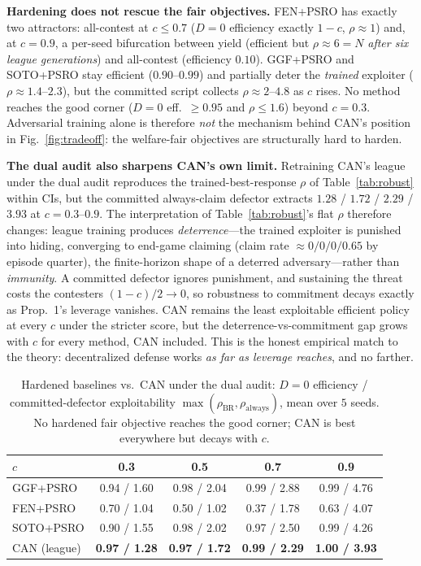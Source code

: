 \documentclass[conference, a4paper]{IEEEtran}
\begin{document}
\textbf{Hardening does not rescue the fair objectives.} FEN+PSRO has exactly two
attractors: all-contest at $c\le0.7$ ($D{=}0$ efficiency exactly $1{-}c$,
$\rho{\approx}1$) and, at $c{=}0.9$, a per-seed bifurcation between yield
(efficient but $\rho{\approx}6{=}N$ \emph{after six league generations}) and
all-contest (efficiency $0.10$). GGF+PSRO and SOTO+PSRO stay efficient
($0.90$--$0.99$) and partially deter the \emph{trained} exploiter
($\rho{\approx}1.4$--$2.3$), but the committed script collects
$\rho{\approx}2$--$4.8$ as $c$ rises. No method reaches the good corner
($D{=}0$ eff.\ $\ge0.95$ and $\rho\le1.6$) beyond $c{=}0.3$. Adversarial training
alone is therefore \emph{not} the mechanism behind CAN's position in
Fig.~\ref{fig:tradeoff}: the welfare-fair objectives are structurally hard to
harden.

\textbf{The dual audit also sharpens CAN's own limit.} Retraining CAN's league
under the dual audit reproduces the trained-best-response $\rho$ of
Table~\ref{tab:robust} within CIs, but the committed always-claim defector
extracts $1.28$ / $1.72$ / $2.29$ / $3.93$ at $c{=}0.3$--$0.9$. The
interpretation of Table~\ref{tab:robust}'s flat $\rho$ therefore changes:
league training produces \emph{deterrence}---the trained exploiter is punished
into hiding, converging to end-game claiming (claim rate
${\approx}0/0/0/0.65$ by episode quarter), the finite-horizon shape of a
deterred adversary---rather than \emph{immunity}. A committed defector ignores
punishment, and sustaining the threat costs the contesters $(1{-}c)/2\to0$, so
robustness to commitment decays exactly as Prop.~1's leverage vanishes. CAN
remains the least exploitable efficient policy at every $c$ under the stricter
score, but the deterrence-vs-commitment gap grows with $c$ for every method,
CAN included. This is the honest empirical match to the theory: decentralized
defense works \emph{as far as leverage reaches}, and no farther.

\begin{table}[t]
\caption{Hardened baselines vs.\ CAN under the dual audit: $D{=}0$ efficiency /
committed-defector exploitability $\max(\rho_{\mathrm{BR}},
\rho_{\mathrm{always}})$, mean over $5$ seeds. No hardened fair objective
reaches the good corner; CAN is best everywhere but decays with $c$.}
\label{tab:hardened}
\centering
\begin{tabular}{lcccc}
\toprule
$c$ & 0.3 & 0.5 & 0.7 & 0.9 \\
\midrule
GGF+PSRO  & 0.94 / 1.60 & 0.98 / 2.04 & 0.99 / 2.88 & 0.99 / 4.76 \\
FEN+PSRO  & 0.70 / 1.04 & 0.50 / 1.02 & 0.37 / 1.78 & 0.63 / 4.07 \\
SOTO+PSRO & 0.90 / 1.55 & 0.98 / 2.02 & 0.97 / 2.50 & 0.99 / 4.26 \\
CAN (league) & \textbf{0.97 / 1.28} & \textbf{0.97 / 1.72} &
\textbf{0.99 / 2.29} & \textbf{1.00 / 3.93} \\
\bottomrule
\end{tabular}
\end{table}
\end{document}
